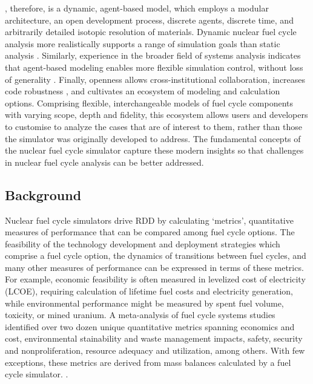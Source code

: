 \Cyclus, therefore, is a dynamic, agent-based model, which employs a modular
architecture, an open development process, discrete agents, discrete time, and
arbitrarily detailed isotopic resolution of materials. Dynamic nuclear fuel
cycle analysis more realistically supports a range of simulation goals than
static analysis \cite{piet_dynamic_2011}. Similarly, experience in the broader
field of systems analysis indicates that agent-based modeling enables more
flexible simulation control, without loss of generality
\cite{macal_agent-based_2010}. Finally, openness allows cross-institutional
collaboration, increases code robustness \cite{cohen_modern_2010}, and
cultivates an ecosystem of modeling and calculation options.  Comprising
flexible, interchangeable models of fuel cycle components with varying scope,
depth and fidelity, this ecosystem allows users and developers to customise
\Cyclus to analyze the cases that are of interest to them, rather than those
the simulator was originally developed to address.  The fundamental concepts of
the \Cyclus nuclear fuel cycle simulator capture these modern insights so that
challenges in nuclear fuel cycle analysis can be better addressed.

\subsection{Background}



Nuclear fuel cycle simulators drive \gls{RDD} by calculating `metrics',
quantitative measures of performance that can be compared among fuel cycle
options. The feasibility of the technology development and deployment
strategies which comprise a fuel cycle option, the dynamics of transitions
between fuel cycles, and many other measures of performance can be expressed in
terms of these metrics. For example, economic feasibility is often measured in
levelized cost of electricity (\gls{LCOE}), requiring calculation of lifetime
fuel costs and electricity generation, while environmental performance might be
measured by spent fuel volume, toxicity, or mined uranium.  A meta-analysis of
fuel cycle systems studies identified over two dozen unique quantitative
metrics spanning economics and cost, environmental stainability and waste
management impacts, safety, security and nonproliferation, resource adequacy
and utilization, among others. With few exceptions, these metrics are derived
from mass balances calculated by a fuel cycle simulator.
\cite{flicker_evaluation_2014}.

